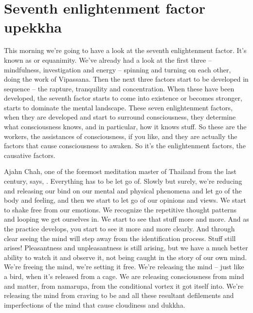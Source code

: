 \documentclass[letterpaper,10pt,english]{sphinxmanual}
\begin{document}
\section{Seventh enlightenment factor upekkha}
\label{\detokenize{7-a:seventh-enlightenment-factor-upekkha}}
\sphinxAtStartPar
This morning we’re going to have a look at the seventh enlightenment
factor. It’s known as
or equanimity. We’ve already had a look at the
first  three  –  mindfulness,  investigation  and  energy  –  spinning  and  turning
on each other, doing the work of Vipassana. Then the next three factors start
to  be  developed  in  sequence  –  the  rapture,  tranquility  and  concentration.
When these have been developed, the seventh factor starts to come into existence or becomes stronger, starts to dominate the mental landscape. These
seven enlightenment factors, when they are developed and start to surround
consciousness, they determine what consciousness knows, and in particular,
how it knows stuff. So these are the workers, the assistances of consciousness, if you like, and they are actually the factors that cause consciousness to
awaken. So it’s the enlightenment factors, the causative factors.

\sphinxAtStartPar
Ajahn Chah, one of the foremost meditation master of Thailand from
the last century, says,
. Everything has to be let go of. Slowly but surely, we’re reducing and
releasing our bind on our mental and physical phenomena and let go of the
body and feeling, and then we start to let go of our opinions and views. We
start to shake free from our emotions. We recognize the repetitive thought
  patterns and looping we get ourselves in. We start to see that stuff more and
more. And as the practice develops, you start to see it more and more clearly.
And  through  clear  seeing  the  mind  will  step  away  from  the  identification
process.  Stuff  still  arises!  Pleasantness  and  unpleasantness  is  still  arising,
but we have a much better ability to watch it and observe it, not being caught
in the story of our own mind. We’re freeing the mind, we’re setting it free.
We’re releasing the mind – just like a bird, when it’s released from a cage.
We  are  releasing  consciousness  from  mind  and  matter,  from  nama\sphinxhyphen{}rupa,
from the conditional vortex it got itself into. We’re releasing the mind from
craving  to  be  and  all  these  resultant  defilements  and  imperfections  of  the
mind that cause cloudiness and dukkha.
\end{document}
